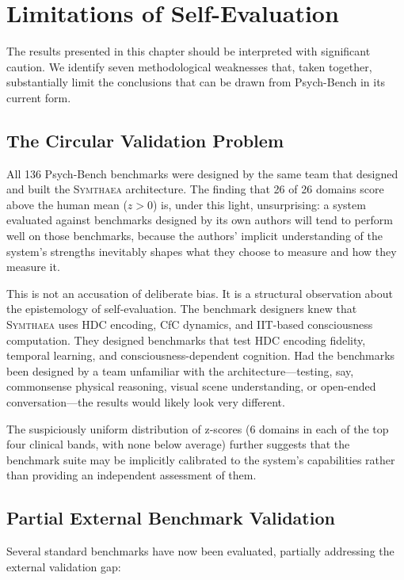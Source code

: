 \documentclass[12pt]{book}
\newcommand{\symthaea}{\textsc{Symthaea}}
\begin{document}
\section{Limitations of Self-Evaluation}
\label{sec:self-eval-limitations}

The results presented in this chapter should be interpreted with significant caution. We identify seven methodological weaknesses that, taken together, substantially limit the conclusions that can be drawn from Psych-Bench in its current form.

\subsection{The Circular Validation Problem}

All 136 Psych-Bench benchmarks were designed by the same team that designed and built the \symthaea{} architecture. The finding that 26 of 26 domains score above the human mean ($z > 0$) is, under this light, unsurprising: a system evaluated against benchmarks designed by its own authors will tend to perform well on those benchmarks, because the authors' implicit understanding of the system's strengths inevitably shapes what they choose to measure and how they measure it.

This is not an accusation of deliberate bias. It is a structural observation about the epistemology of self-evaluation. The benchmark designers knew that \symthaea{} uses HDC encoding, CfC dynamics, and IIT-based consciousness computation. They designed benchmarks that test HDC encoding fidelity, temporal learning, and consciousness-dependent cognition. Had the benchmarks been designed by a team unfamiliar with the architecture---testing, say, commonsense physical reasoning, visual scene understanding, or open-ended conversation---the results would likely look very different.

The suspiciously uniform distribution of z-scores (6 domains in each of the top four clinical bands, with none below average) further suggests that the benchmark suite may be implicitly calibrated to the system's capabilities rather than providing an independent assessment of them.

\subsection{Partial External Benchmark Validation}

Several standard benchmarks have now been evaluated, partially addressing the external validation gap:
\end{document}
